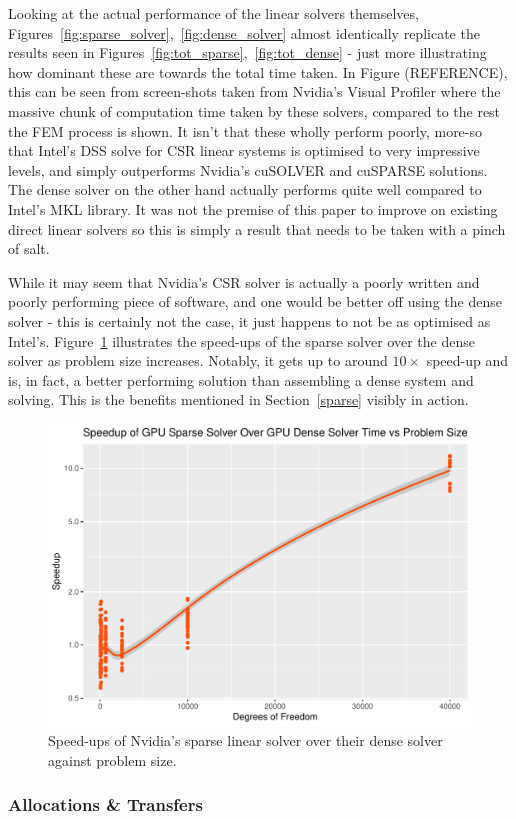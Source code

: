Looking at the actual performance of the linear solvers themselves, Figures~\ref{fig:sparse_solver},~\ref{fig:dense_solver} almost identically replicate the results seen in Figures~\ref{fig:tot_sparse},~\ref{fig:tot_dense} - just more illustrating how dominant these are towards the total time taken. In Figure (REFERENCE), this can be seen from screen-shots taken from Nvidia's Visual Profiler where the massive chunk of computation time taken by these solvers, compared to the rest the FEM process is shown. It isn't that these wholly perform poorly, more-so that Intel's DSS solve for CSR linear systems is optimised to very impressive levels, and simply outperforms Nvidia's cuSOLVER and cuSPARSE solutions. The dense solver on the other hand actually performs quite well compared to Intel's MKL library. It was not the premise of this paper to improve on existing direct linear solvers so this is simply a result that needs to be taken with a pinch of salt.

While it may seem that Nvidia's CSR solver is actually a poorly written and poorly performing piece of software, and one would be better off using the dense solver - this is certainly not the case, it just happens to not be as optimised as Intel's. Figure~\ref{fig:gpu_solve} illustrates the speed-ups of the sparse solver over the dense solver as problem size increases. Notably, it gets up to around $10\times$ speed-up and is, in fact, a better performing solution than assembling a dense system and solving. This is the benefits mentioned in Section~\ref{sparse} visibly in action.

\begin{figure}
	\centering
	\includegraphics[width = 0.48\linewidth]{Plots/solve_gpus_speedup_vs_n}
	\caption{Speed-ups of Nvidia's sparse linear solver over their dense solver against problem size.}
	\label{fig:gpu_solve}
\end{figure}

\subsubsection{Allocations \& Transfers}

